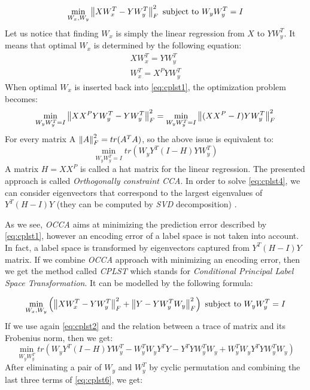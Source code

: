 \begin{equation}\label{eq:cplst1}
    \min_{W_x, W_y} \left\lVert XW_x^T-YW_y^T\right\rVert_{F}^2  
    \text{  subject to   } W_yW_y^T=I   
\end{equation}
Let us notice that finding $W_x$ is simply the linear regression from $X$ to $YW_y^T$. It means that optimal $W_x$ is determined by the following equation:
\begin{equation}\label{eq:cplst2}
\begin{split}
    XW_x^T=YW_y^T \\
    W_x^T=X^PYW_y^T
\end{split}
\end{equation}
When optimal $W_x$ is inserted back into \cref{eq:cplst1}, the optimization problem becomes:
\begin{equation}\label{eq:cplst3}
    \min_{W_yW_y^T=I} \left\lVert XX^PYW_y^T-YW_y^T\right\rVert_{F}^2=\min_{W_yW_y^T=I} \left\lVert(XX^P-I)YW_y^T\right\rVert_{F}^2
\end{equation}
For every matrix A $\left\lVert A\right\rVert_{F}^2=tr(A^TA)$, so the above issue is equivalent to:
\begin{equation}\label{eq:cplst4}
    \min_{W_yW_y^T=I} tr(W_yY^T(I-H)YW_y^T)
\end{equation}
A matrix $H=XX^P$ is called a hat matrix for the linear regression. The presented approach is called \textit{Orthogonally constraint CCA}. In order to solve \cref{eq:cplst4}, we can consider eigenvectors that correspond to the largest eigenvalues of $Y^T(H-I)Y$ (they can be computed by \textit{SVD} decomposition) \cite{ChenLin}.

As we see, \textit{OCCA} aims at minimizing the prediction error described by \cref{eq:cplst1}, however an encoding error of a label space is not taken into account. In fact, a label space is transformed by eigenvectors captured from $Y^T(H-I)Y$ matrix. If we combine \textit{OCCA} approach with minimizing an encoding error, then we get the method called \textit{CPLST} which stands for \textit{Conditional Principal Label Space Transformation}. It can be modelled by the following formula:

\begin{equation}\label{eq:cplst5}
    \min_{W_x, W_y} \left(\left\lVert XW_x^T-YW_y^T\right\rVert_{F}^2 + \left\lVert Y-YW_y^TW_y\right\rVert_{F}^2\right)  
    \text{  subject to   } W_yW_y^T=I   
\end{equation}
If we use again \cref{eq:cplst2} and the relation between a trace of matrix and its Frobenius norm, then we get:
\begin{equation}\label{eq:cplst6}
    \min_{W_yW_y^T} tr(W_yY^T(I-H)YW_y^T-W_y^TW_yY^TY-Y^TYW_y^TW_y+W_y^TW_yY^TYW_y^TW_y)  
\end{equation}
After eliminating a pair of $W_y$ and $W_y^T$ by cyclic permutation and combining the last three terms of \cref{eq:cplst6}, we get:

